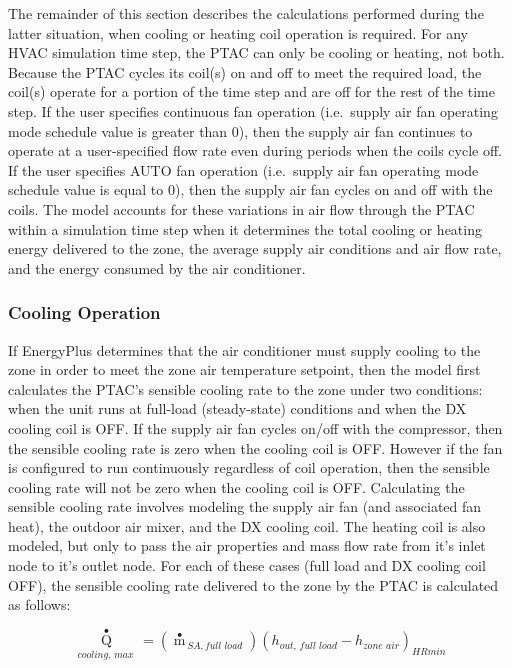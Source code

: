 The remainder of this section describes the calculations performed during the latter situation, when cooling or heating coil operation is required. For any HVAC simulation time step, the PTAC can only be cooling or heating, not both. Because the PTAC cycles its coil(s) on and off to meet the required load, the coil(s) operate for a portion of the time step and are off for the rest of the time step. If the user specifies continuous fan operation (i.e.~supply air fan operating mode schedule value is greater than 0), then the supply air fan continues to operate at a user-specified flow rate even during periods when the coils cycle off. If the user specifies AUTO fan operation (i.e.~supply air fan operating mode schedule value is equal to 0), then the supply air fan cycles on and off with the coils. The model accounts for these variations in air flow through the PTAC within a simulation time step when it determines the total cooling or heating energy delivered to the zone, the average supply air conditions and air flow rate, and the energy consumed by the air conditioner.

\subsubsection{Cooling Operation}\label{cooling-operation-001}

If EnergyPlus determines that the air conditioner must supply cooling to the zone in order to meet the zone air temperature setpoint, then the model first calculates the PTAC's sensible cooling rate to the zone under two conditions: when the unit runs at full-load (steady-state) conditions and when the DX cooling coil is OFF. If the supply air fan cycles on/off with the compressor, then the sensible cooling rate is zero when the cooling coil is OFF. However if the fan is configured to run continuously regardless of coil operation, then the sensible cooling rate will not be zero when the cooling coil is OFF. Calculating the sensible cooling rate involves modeling the supply air fan (and associated fan heat), the outdoor air mixer, and the DX cooling coil. The heating coil is also modeled, but only to pass the air properties and mass flow rate from it's inlet node to it's outlet node. For each of these cases (full load and DX cooling coil OFF), the sensible cooling rate delivered to the zone by the PTAC is calculated as follows:

\begin{equation}
{\mathop Q\limits^ \bullet_{cooling,\,max\,}} = \left( {{{\mathop m\limits^ \bullet  }_{\,SA,full\,\,load}}} \right){\left( {{h_{out,\,full\,\,load}} - {h_{zone\,\,air}}} \right)_{HRmin}}
\end{equation}

